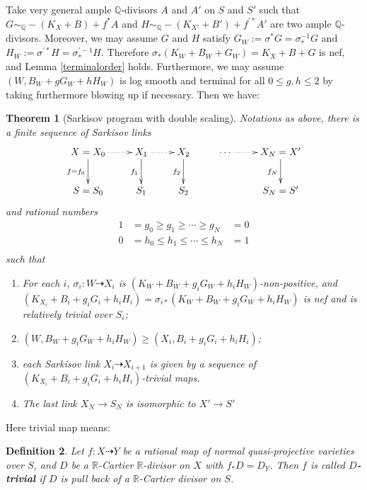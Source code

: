 \documentclass[11pt]{amsart}
\newtheorem{defn}{Definition}[section]
\newtheorem{thm}[defn]{Theorem}
\begin{document}
Take  very general ample $\mathbb{Q}$-divisors $ A $ and $ A' $ on $ S $ and $ S' $ such that $ G\sim_{\mathbb{Q}}-(K_X+B)+f^*A $ and $ H\sim_{\mathbb{Q}}-(K_{X'}+B')+f^{'*}A' $ are two ample $\mathbb{Q}$-divisors. Moreover, we may assume $ G $ and $ H $ satisfy $G_{W}:= \sigma^*G=\sigma^{-1}_*G $ and $ H_{W}:=\sigma^{'*}H=\sigma^{'-1}_*H $. Therefore $\sigma_{*}(K_{W}+B_{W}+G_{W})=K_{X}+B+G$ is nef, and Lemma \ref{terminalorder} holds.
Furthermore, we may assume $(W,B_W+gG_W+hH_W)$ is log smooth and terminal for all $0\leqslant g,h\leqslant 2$ by taking furthermore blowing up if necessary.
Then we have:
\begin{thm}[Sarkisov program with double scaling]\label{main2}
  \cite[Claim 13.12]{haconMinimalModelProgram2012}
Notations as above, there is a finite sequence of Sarkisov links
\[
  \xymatrix{
    X=X_0\ar@{.>}[r]\ar[d]_{f=f_{0}}&X_{1}\ar@{.>}[r]\ar[d]_{f_{1}}& X_{2}\ar[d]_{f_{2}} &\cdots\ar@{.>}[r]&X_N=X'\ar[d]_{f_{N}} \\
    S=S_{0}&S_{1} &S_{2}&&S_N=S'
  }
\]
and rational numbers
\[
  \begin{aligned}
    1&=g_0\geqslant g_1 \geqslant \cdots \geqslant g_N&=0\\
    0&=h_0\leqslant h_{1} \leqslant \cdots \leqslant h_N&=1\\
  \end{aligned}
\]
such that 
\begin{enumerate}
  \item For each $i$, $\sigma_i:W\dashrightarrow  X_{i}$ is $(K_{W}+B_{W}+g_{i}G_{W}+h_{i}H_{W})$-non-positive, and $(K_{X_{i}}+B_{i}+g_{i}G_{i}+h_{i}H_{i})=\sigma_{i*}(K_{W}+B_{W}+g_{i}G_{W}+h_{i}H_{W})$ is nef and is relatively trivial over $S_{i}$;
  \item $(W,B_{W}+g_{i}G_{W}+h_{i}H_{W})\geqslant (X_{i},B_{i}+g_{i}G_{i}+h_{i}H_{i})$;
  \item each Sarkisov link $X_{i}\dashrightarrow X_{i+1}$ is given by a sequence of $(K_{X_{i}}+B_{i}+g_{i}G_{i}+h_{i}H_{i})$-trivial maps.
    \item  The last link $X_{N} \to S_{N}$ is isomorphic to $X'\to S'$
\end{enumerate}
\end{thm}
Here trivial map means:
\begin{defn}\label{rivialmap}
  \cite[\S 13.2]{haconMinimalModelProgram2012} Let $f:X\dashrightarrow Y$ be a rational map of normal quasi-projective varieties over $S$, and $D$ be a $\mathbb{R}$-Cartier $\mathbb{R}$-divisor  on $X$ with $f_*D=D_Y$. Then $f$ is called \textbf{$D$-trivial} if $D$ is pull back of a $\mathbb{R}$-Cartier divisor on $S$.
\end{defn}
\end{document}
